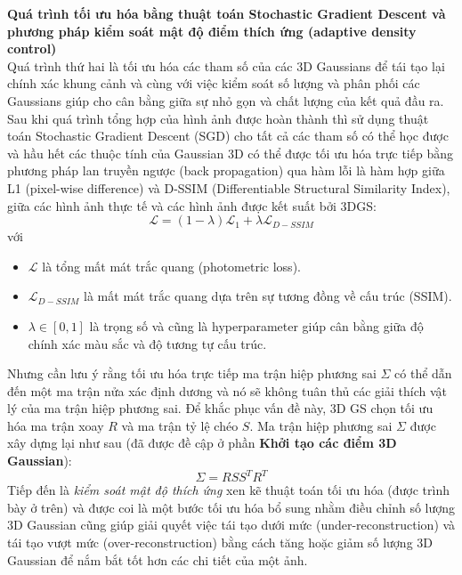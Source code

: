         \textbf{Quá trình tối ưu hóa bằng thuật toán Stochastic Gradient Descent và phương pháp kiểm soát mật độ điểm thích ứng (adaptive density control)} \\
        
        Quá trình thứ hai là tối ưu hóa các tham số của các 3D Gaussians để tái tạo lại chính xác khung cảnh và cùng với việc kiểm soát số lượng và phân phối các Gaussians giúp cho cân bằng giữa sự nhỏ gọn và chất lượng của kết quả đầu ra. \\
        
        Sau khi quá trình tổng hợp của hình ảnh được hoàn thành thì sử dụng thuật toán  Stochastic Gradient Descent (SGD) cho tất cả các tham số có thể học được và hầu hết các thuộc tính của Gaussian 3D có thể được tối ưu hóa trực tiếp bằng phương pháp lan truyền ngược (back propagation) qua hàm lỗi là hàm hợp giữa L1 (pixel-wise difference) và D-SSIM (Differentiable Structural Similarity Index), giữa các hình ảnh thực tế và các hình ảnh được kết suất bởi 3DGS:
        $$\mathcal{L} = (1 - \lambda)\mathcal{L}_1 + \lambda \mathcal{L}_{D-SSIM}$$
        với
        \begin{itemize}
            \item $\mathcal{L}$ là tổng mất mát trắc quang (photometric loss).
            \item $\mathcal{L}_{D-SSIM}$ là mất mát trắc quang dựa trên sự tương đồng về cấu trúc (SSIM).
            \item $\lambda \in [0, 1]$ là trọng số và cũng là hyperparameter giúp cân bằng giữa độ chính xác màu sắc và độ tương tự cấu trúc.
        \end{itemize}
         Nhưng cần lưu ý rằng tối ưu hóa trực tiếp ma trận hiệp phương sai $\Sigma$ có thể dẫn đến một ma trận nửa xác định dương và nó sẽ không tuân thủ các giải thích vật lý của ma trận hiệp phương sai. Để khắc phục vấn đề này, 3D GS chọn tối ưu hóa ma trận xoay $R$ và ma trận tỷ lệ chéo $S$. Ma trận hiệp phương sai $\Sigma$ được xây dựng lại như sau (đã được đề cập ở phần \textbf{Khởi tạo các điểm 3D Gaussian}):
        $$\Sigma = R S S^{T} R^{T}$$
        Tiếp đến là \textit{kiểm soát mật độ thích ứng} xen kẽ thuật toán tối ưu hóa (được trình bày ở trên) và được coi là một bước tối ưu hóa bổ sung nhằm điều chỉnh số lượng 3D Gaussian cũng giúp giải quyết việc tái tạo dưới mức (under-reconstruction) và tái tạo vượt mức (over-reconstruction) bằng cách tăng hoặc giảm số lượng 3D Gaussian để nắm bắt tốt hơn các chi tiết của một ảnh. \\

